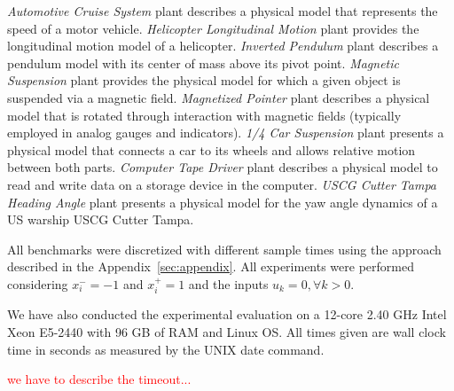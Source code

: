 \documentclass[runningheads,a4paper]{llncs}
\begin{document}
\textit{Automotive Cruise System} plant describes a physical model that represents 
the speed of a motor vehicle. 
\textit{Helicopter Longitudinal Motion} plant provides the 
longitudinal motion model of a helicopter. 
\textit{Inverted Pendulum} plant describes a pendulum model
with its center of mass above its pivot point. 
\textit{Magnetic Suspension} plant provides the physical model for which 
a given object is suspended via a magnetic field. 
\textit{Magnetized Pointer} plant describes a physical model that is rotated through interaction 
with magnetic fields (typically employed in analog gauges and indicators).
\textit{1/4 Car Suspension} plant presents a physical model that connects a car to its wheels 
and allows relative motion between both parts.
\textit{Computer Tape Driver} plant describes a physical model to read and write data 
on a storage device in the computer.
\textit{USCG Cutter Tampa Heading Angle} plant presents a physical model 
for the yaw angle dynamics of a US warship USCG Cutter Tampa.

All benchmarks were discretized with different sample times using 
the approach described in the Appendix~\ref{sec:appendix}. 
All experiments were performed considering $x_{i}^{-}=-1$ and 
$x_{i}^{+}=1$ and the inputs $u_{k}=0, \forall k>0$.

We have also conducted the experimental evaluation on a 12-core 2.40 GHz
Intel Xeon E5-2440 with 96 GB of RAM and Linux OS. All times given are wall 
clock time in seconds as measured by the UNIX date command. 

\textcolor{red}{we have to describe the timeout...}
\end{document}

